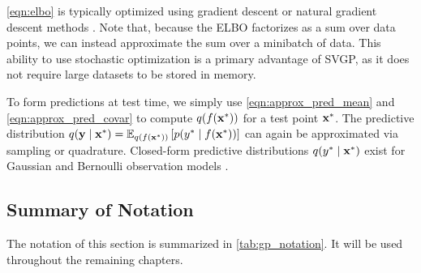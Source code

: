 \cref{eqn:elbo} is typically optimized using gradient descent or natural gradient descent methods \cite{hensman2012fast,salimbeni2017doubly}.
Note that, because the ELBO factorizes as a sum over data points, we can instead approximate the sum over a minibatch of data.
This ability to use stochastic optimization is a primary advantage of SVGP, as it does not require large datasets to be stored in memory.

To form predictions at test time, we simply use \cref{eqn:approx_pred_mean} and \cref{eqn:approx_pred_covar} to compute $q(f(\mathbf{x}^*))$ for a test point $\mathbf{x}^*$.
The predictive distribution $q(\mathbf{y} \mid \mathbf{x}^*) = \operatorname*{\mathbb{E}}_{q(f(\mathbf{x}^*))} \left[  p(y^* \mid f(\mathbf{x}^*))  \right]$ can again be approximated via sampling or quadrature.
Closed-form predictive distributions $q(y^* \mid \mathbf{x}^*)$ exist for Gaussian and Bernoulli observation models \citep{rasmussen2006gaussian}.

\subsection{Summary of Notation}
The notation of this section is summarized in \cref{tab:gp_notation}.
It will be used throughout the remaining chapters.

